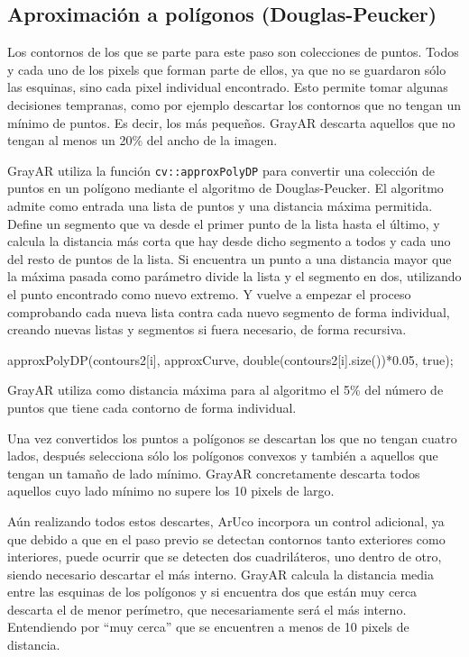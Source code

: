 \subsection{Aproximación a polígonos (Douglas-Peucker)}
Los contornos de los que se parte para este paso son colecciones de puntos. Todos y cada uno de los pixels que forman parte de ellos, ya que no se guardaron sólo las esquinas, sino cada pixel individual encontrado. Esto permite tomar algunas decisiones tempranas, como por ejemplo descartar los contornos que no tengan un mínimo de puntos. Es decir, los más pequeños. GrayAR descarta aquellos que no tengan al menos un 20\% del ancho de la imagen. 

GrayAR utiliza la función \texttt{cv::approxPolyDP}  para convertir una colección de puntos en un polígono mediante el algoritmo de Douglas-Peucker. El algoritmo admite como entrada una lista de puntos y una distancia máxima permitida. Define un segmento que va desde el primer punto de la lista hasta el último, y calcula la distancia más corta que hay desde dicho segmento a todos y cada uno del resto de puntos de la lista. Si encuentra un punto a una distancia mayor que la máxima pasada como parámetro divide la lista y el segmento en dos, utilizando el punto encontrado como nuevo extremo. Y vuelve a empezar el proceso comprobando cada nueva lista contra cada nuevo segmento de forma individual, creando nuevas listas y segmentos si fuera necesario, de forma recursiva.

\begin{listing}[]
approxPolyDP(contours2[i], approxCurve, double(contours2[i].size())*0.05, true);
\end{listing} 
 
GrayAR utiliza como distancia máxima para al algoritmo el 5\% del número de puntos que tiene cada contorno de forma individual. 

Una vez convertidos los puntos a polígonos se descartan los que no tengan cuatro lados, después selecciona sólo los polígonos convexos y también a aquellos que tengan un tamaño de lado mínimo. GrayAR concretamente descarta todos aquellos cuyo lado mínimo no supere los 10 pixels de largo. 

Aún realizando todos estos descartes, ArUco incorpora un control adicional, ya que debido a que en el paso previo se detectan contornos tanto exteriores como interiores, puede ocurrir que se detecten dos cuadriláteros, uno dentro de otro, siendo necesario descartar el más interno. GrayAR calcula la distancia media entre las esquinas de los polígonos y si encuentra dos que están muy cerca descarta el de menor perímetro, que necesariamente será el más interno. Entendiendo por ``muy cerca'' que se encuentren a menos de 10 pixels de distancia.

